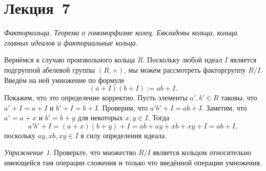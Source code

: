 \documentclass[a4paper,10pt]{amsart}
\theoremstyle{definition}
\theoremstyle{remark}
\newtheorem{exercise}{Упражнение}
\begin{document}
%


\newpage

\section*{Лекция~7}

\medskip

{\it Факторкольца. Теорема о
гомоморфизме колец. Евклидовы кольца, кольца главных идеалов и факториальные
кольца.}

\medskip



Вернёмся к случаю произвольного кольца $R$. Поскольку любой идеал
$I$ является подгруппой абелевой группы $(R,+)$, мы можем
рассмотреть факторгруппу $R/I$. Введём на ней умножение по формуле
$$
(a+I)(b+I) := ab + I.
$$
Покажем, что это определение корректно. Пусть элементы $a',b' \in R$
таковы, что $a' + I = a + I$ и $b' + I = b + I$. Проверим, что $a'b'
+ I = ab + I$. Заметим, что $a' = a + x$ и $b' = b + y$ для
некоторых $x, y \in I$. Тогда
$$
a'b' + I = (a + x)(b + y) + I = ab + ay + xb + xy + I = ab + I,
$$
поскольку $ay, xb, xy \in I$ в силу определения идеала.

\begin{exercise}
Проверьте, что множество $R/I$ является кольцом относительно
имеющейся там операции сложения и только что введённой операции
умножения.
\end{exercise}
\end{document}
